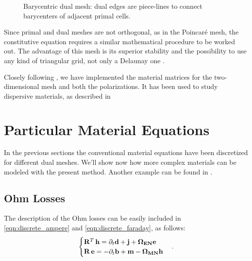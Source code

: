 \begin{figure}[htbp]
  \begin{center}
    \resizebox{4cm}{!}{}
  \end{center}
  \caption{Barycentric dual mesh: dual edges are piece-lines to
  connect barycenters of adjacent primal cells.}
  \label{fig:barycentric}
\end{figure}

Since primal and dual meshes are not orthogonal, as in the Poincar\'e
mesh, the constitutive equation requires a similar mathematical
procedure to be worked out. The advantage of this mesh is its superior
stability and the possibility to use any kind of triangular grid, not
only a Delaunay one \cite{marrone_computational}.

Closely following \cite{marrone_computational}, we have implemented the
material matrices for the two-dimensional mesh and both the
polarizations. It has been used to study dispersive materials, as
described in 


\section{Particular Material Equations} \label{sec:particular_material_equations}

In the previous sections the conventional material equations have been
discretized for different dual meshes. We'll show now how more complex
materials can be modeled with the present method. Another example can be
found in .

\subsection{Ohm Losses} \label{sec:ohm_losses}

The description of the Ohm losses can be easily included in
\eqref{eqn:discrete_ampere} and \eqref{eqn:discrete_faraday}, as follows:
\begin{equation*} \begin{cases}
    {{\mathbf{R}}^T\,\mathbf{h}} = \partial_t \mathbf{d} + \mathbf{j} + \mathbf{\Omega_{EN}} \mathbf{e} \\
    {\mathbf{R}\,\mathbf{e}} = -\partial_t \mathbf{b} + \mathbf{m} - \mathbf{\Omega_{MN}} \mathbf{h}
\end{cases} . \end{equation*}

